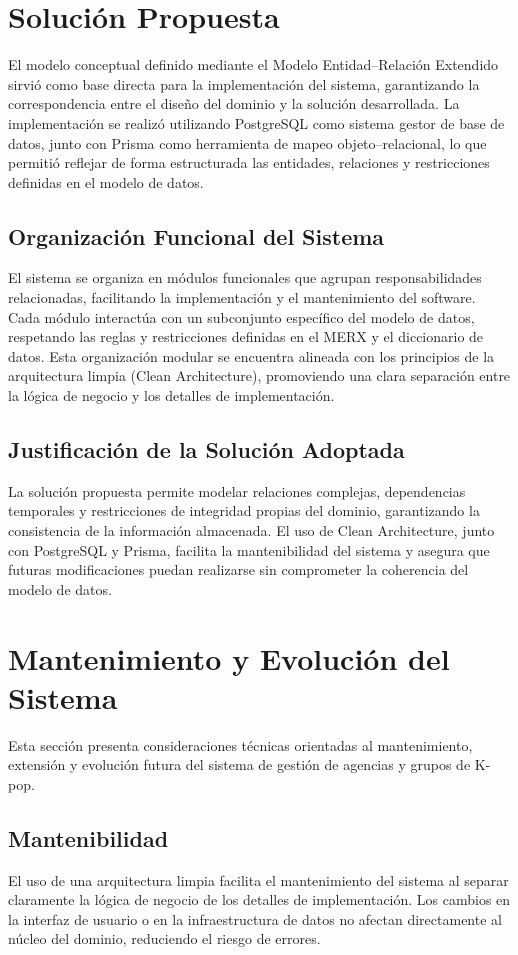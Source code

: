 \documentclass[12pt,a4paper,spanish,oneside]{report}
\begin{document}
\chapter{Solución Propuesta}
El modelo conceptual definido mediante el Modelo Entidad–Relación Extendido sirvió
como base directa para la implementación del sistema, garantizando la correspondencia
entre el diseño del dominio y la solución desarrollada.
La implementación se realizó utilizando PostgreSQL como sistema gestor de base de
datos, junto con Prisma como herramienta de mapeo objeto–relacional, lo que permitió
reflejar de forma estructurada las entidades, relaciones y restricciones definidas en el
modelo de datos.

\section{Organización Funcional del Sistema}
El sistema se organiza en módulos funcionales que agrupan responsabilidades relacionadas, facilitando la implementación y el mantenimiento del software. Cada módulo
interactúa con un subconjunto específico del modelo de datos, respetando las reglas y
restricciones definidas en el MERX y el diccionario de datos.
Esta organización modular se encuentra alineada con los principios de la arquitectura
limpia (Clean Architecture), promoviendo una clara separación entre la lógica de negocio
y los detalles de implementación.

\section{Justificación de la Solución Adoptada}
La solución propuesta permite modelar relaciones complejas, dependencias temporales y restricciones de integridad propias del dominio, garantizando la consistencia de la
información almacenada.
El uso de Clean Architecture, junto con PostgreSQL y Prisma, facilita la mantenibilidad del sistema y asegura que futuras modificaciones puedan realizarse sin comprometer
la coherencia del modelo de datos.

\chapter{Mantenimiento y Evolución del Sistema}
Esta sección presenta consideraciones técnicas orientadas al mantenimiento, extensión
y evolución futura del sistema de gestión de agencias y grupos de K-pop.

\section{Mantenibilidad}
El uso de una arquitectura limpia facilita el mantenimiento del sistema al separar
claramente la lógica de negocio de los detalles de implementación. Los cambios en la
interfaz de usuario o en la infraestructura de datos no afectan directamente al núcleo del
dominio, reduciendo el riesgo de errores.
\end{document}
